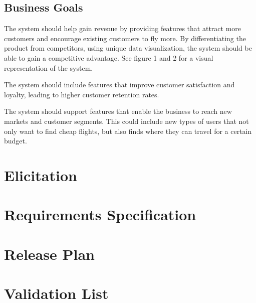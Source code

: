 \documentclass[a4paper]{article}
\begin{document}
\subsection{Business Goals}
The system should help gain revenue by providing features that attract more customers and encourage existing customers to fly more. By differentiating the product from competitors, using unique data visualization, the system should be able to gain a competitive advantage. See figure 1 and 2 for a visual representation of the system.

The system should include features that improve customer satisfaction and loyalty, leading to higher customer retention rates.

The system should support features that enable the business to reach new markets and customer segments. This could include new types of users that not only want to find cheap flights, but also finds where they can travel for a certain budget.

\section{Elicitation}


\newpage
\section{Requirements Specification}



\section{Release Plan}


\section{Validation List}


\end{document}
